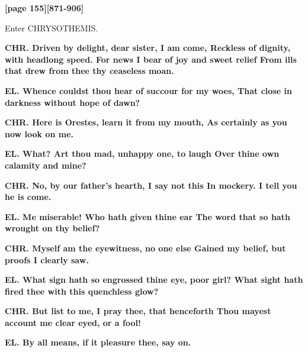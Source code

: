 \documentclass[11pt,letter]{book}
\begin{document}
\par \textbf{[page 155][871-906]}
\par 

\par  Enter CHRYSOTHEMIS.

\par \textbf{CHR. Driven by delight, dear sister, I am come, Reckless of dignity, with headlong speed. For news I bear of joy and sweet relief From ills that drew from thee thy ceaseless moan.}
\par 

\par \textbf{EL. Whence couldst thou hear of succour for my woes, That close in darkness without hope of dawn?}
\par 

\par \textbf{CHR. Here is Orestes, learn it from my mouth, As certainly as you now look on me.}
\par 

\par \textbf{EL. What? Art thou mad, unhappy one, to laugh Over thine own calamity and mine?}
\par 

\par \textbf{CHR. No, by our father’s hearth, I say not this In mockery. I tell you he is come.}
\par 

\par \textbf{EL. Me miserable! Who hath given thine ear The word that so hath wrought on thy belief?}
\par 

\par \textbf{CHR. Myself am the eyewitness, no one else Gained my belief, but proofs I clearly saw.}
\par 

\par \textbf{EL. What sign hath so engrossed thine eye, poor girl? What sight hath fired thee with this quenchless glow?}
\par 

\par \textbf{CHR. But list to me, I pray thee, that henceforth Thou mayest account me clear eyed, or a fool!}
\par 

\par \textbf{EL. By all means, if it pleasure thee, say on.}
\par 
\end{document}
